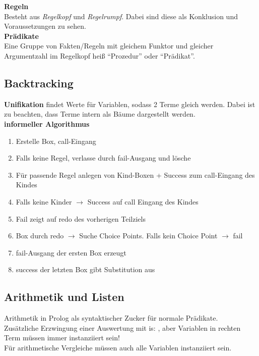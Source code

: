 \textbf{Regeln}\\
Besteht aus \textit{Regelkopf} und \textit{Regelrumpf}. Dabei sind diese als Konklusion und Voraussetzungen zu sehen.
\\

\textbf{Prädikate}\\
Eine Gruppe von Fakten/Regeln mit gleichem Funktor und gleicher Argumentzahl im Regelkopf heiß \enquote{Prozedur}
oder \enquote{Prädikat}.

\newpage
\subsection{Backtracking}%
\label{lp:sub:backtracking}
\textbf{Unifikation} findet Werte für Variablen, sodass 2 Terme gleich werden. Dabei ist zu beachten, dass Terme intern
als Bäume dargestellt werden.\\
\textbf{informeller Algorithmus}
\begin{enumerate}
  \item Erstelle Box, call-Eingang
  \item Falls keine Regel, verlasse durch fail-Ausgang und lösche
  \item Für passende Regel anlegen von Kind-Boxen + Success zum call-Eingang des Kindes
  \item Falls keine Kinder \(\rightarrow\) Success auf call Eingang des Kindes
  \item Fail zeigt auf redo des vorherigen Teilziels
  \item Box durch redo \(\rightarrow\) Suche Choice Points. Falls kein Choice Point \(\rightarrow\) fail
  \item fail-Ausgang der ersten Box erzeugt 
  \item success der letzten Box gibt Substitution aus
\end{enumerate}

\subsection{Arithmetik und Listen}%
\label{lp:sub:arithmetik-listen}
Arithmetik in Prolog als syntaktischer Zucker für normale Prädikate.\\
Zusätzliche Erzwingung einer Auswertung mit is: , aber Variablen
in rechten Term müssen immer instanziiert sein!\\
Für arithmetische Vergleiche müssen auch alle Variablen instanziiert sein.

